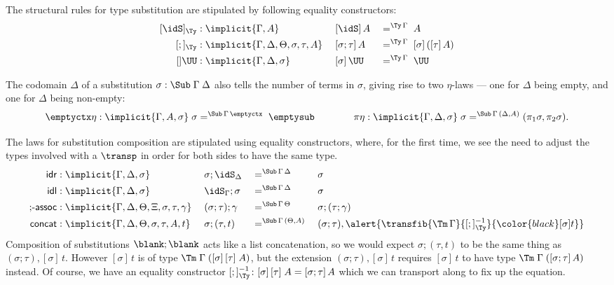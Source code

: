 \documentclass[a4paper,UKenglish,numberwithinsect,cleveref,thm-restate]{lipics-v2021}
\begin{document}
The structural rules for type substitution are stipulated by following equality constructors:
\begin{alignat*}{3}
  [\idS]_{\Ty} & : \implicit{\Gamma, A}                               && [ \idS ] \,A           && =^{\Ty\,\Gamma}\;A \\
  [;]_{\Ty}    & : \implicit{\Gamma, \Delta, \Theta, \sigma, \tau, A}\;&& [ \sigma ; \tau ]\,A  && =^{\Ty\,\Gamma}\;[ \sigma ]\,([ \tau ]\,A) \\
  []\UU      & : \implicit{\Gamma, \Delta, \sigma}                    && [ \sigma ]\,\UU        && =^{\Ty\,\Gamma}\;\UU
\end{alignat*}

The codomain $\Delta$ of a substitution $\sigma:\Sub\;\Gamma\;\Delta$ also tells the number of terms in $\sigma$, giving rise to two $\eta$-laws --- one for $\Delta$ being empty, and one for $\Delta$ being non-empty:
\[
  \emptyctx\eta : \implicit{\Gamma, A, \sigma}\; \sigma        =^{\Sub\,\Gamma\,\emptyctx} \; \emptysub
  \qquad\qquad
  \pi\eta       : \implicit{\Gamma, \Delta, \sigma}\; \sigma   =^{\Sub\,\Gamma\,(\Delta, A)} (\pi_1 \sigma, \pi_2 \sigma).
\]

The laws for substitution composition are stipulated using equality constructors, where, for the first time, we see the need to adjust the types involved with a $\transp$ in order for both sides to have the same type.
\begin{alignat*}{5}
  \mathsf{idr}    & : \implicit{\Gamma, \Delta, \sigma} && {\sigma ; \idS_{\Delta}} && =^{\Sub\,\Gamma\,\Delta} && {\sigma} \\
  \mathsf{idl}    & : \implicit{\Gamma, \Delta, \sigma} && {\idS_{\Gamma} ; \sigma} && =^{\Sub\,\Gamma\,\Delta} && {\sigma} \\
  \text{;-}\mathsf{assoc} & : \implicit{\Gamma, \Delta, \Theta, \Xi, \sigma, \tau, \gamma}\; && (\sigma ; \tau) ; \gamma && =^{\Sub\,\Gamma\,\Theta} &&  \sigma ; (\tau ; \gamma) \\
  \mathsf{concat} & : \implicit{\Gamma, \Delta, \Theta, \sigma, \tau, A, t} \; && \sigma ; (\tau , t)      && =^{\Sub\,\Gamma\,(\Theta, A)} \; &&  (\sigma ; \tau) , \alert{\transfib{\Tm\,\Gamma}{[;]_{\Ty}^{-1}}{\color{black}[ \sigma ] t}}
\end{alignat*}
%
Composition of substitutions $\blank;\blank$ acts like a list concatenation, so
we would expect $\sigma; (\tau, t)$ to be the same thing as $(\sigma; \tau), [\sigma]\,t$. However $[\sigma]\,t$ is of type $\Tm\;\Gamma\;([\sigma]\,[\tau]\;A)$, but the extension $(\sigma; \tau), [\sigma]\,t$ requires $[\sigma]\,t$ to have type $\Tm\;\Gamma\;([\sigma; \tau]\,A)$ instead. Of course, we have an equality constructor $[;]_{\Ty}^{-1}\colon [\sigma]\,[\tau]\;A = [\sigma;\tau]\,A$ which we can transport along to fix up the equation.
\end{document}
